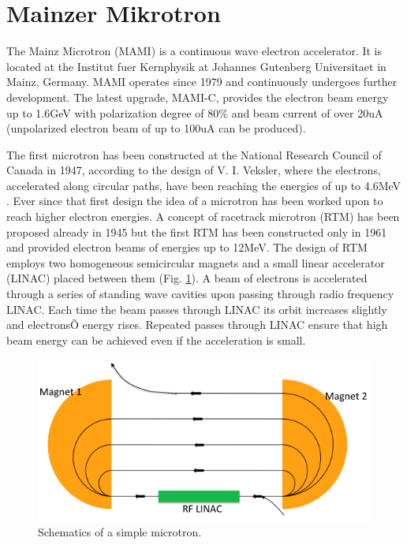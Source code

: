 \section{Mainzer Mikrotron}

\indent The Mainz Microtron (MAMI) is a continuous wave electron accelerator. It is located at the Institut fuer Kernphysik at Johannes Gutenberg Universitaet in Mainz, Germany. MAMI operates since 1979 and continuously undergoes further development. The latest upgrade, MAMI-C, provides the electron beam energy up to 1.6GeV with polarization degree of 80\% and beam current of over 20uA (unpolarized electron beam of up to 100uA can be produced).

\indent The first microtron has been constructed at the National Research Council of Canada in 1947, according to the design of V. I. Veksler, where the electrons, accelerated along circular paths, have been reaching the energies of up to 4.6MeV \cite{dehn}. Ever since that first design the idea of a microtron has been worked upon to reach higher electron energies. A concept of racetrack microtron (RTM) has been proposed already in 1945 but the first RTM has been constructed only in 1961 and provided electron beams of energies up to 12MeV. The design of RTM employs two homogeneous semicircular magnets and a small linear accelerator (LINAC) placed between them (Fig. \ref{microtronplot}). A beam of electrons is accelerated through a series of standing wave cavities upon passing through radio frequency LINAC. Each time the beam passes through LINAC its orbit increases slightly and electronsÕ energy rises. Repeated passes through LINAC ensure that high beam energy can be achieved even if the acceleration is small.

\begin{figure}[H]
\begin{center}
\includegraphics[scale=0.55]{rfm.png}
\caption{Schematics of a simple microtron.}
\label{microtronplot}
\end{center}
\end{figure}

